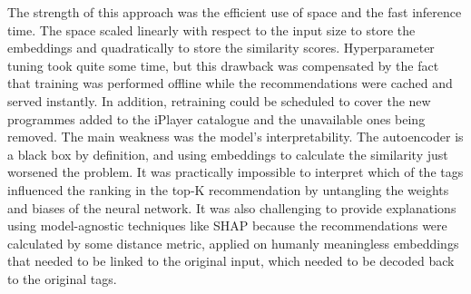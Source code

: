The strength of this approach was the efficient use of space and the fast inference time.
The space scaled linearly with respect to the input size to store the embeddings
and quadratically to store the similarity scores.
Hyperparameter tuning took quite some time, but this drawback was compensated by the fact that training was performed offline
while the recommendations were cached and served instantly.
In addition, retraining could be scheduled to cover the new programmes added to the iPlayer catalogue and the unavailable ones being removed.
The main weakness was the model's interpretability.
The autoencoder is a black box by definition, and using embeddings to calculate the similarity just worsened the problem.
It was practically impossible to interpret which of the tags influenced
the ranking in the top-K recommendation by untangling the weights and biases of the neural network.
It was also challenging to provide explanations using model-agnostic techniques like SHAP
because the recommendations were calculated by some distance metric, applied on
humanly meaningless embeddings that needed to be linked to the original input,
which needed to be decoded back to the original tags.
